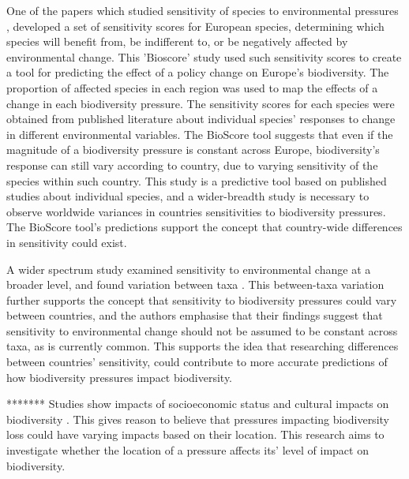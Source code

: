 \documentclass[11pt, a4paper, titlepage]{article}
\begin{document}
	One of the papers which studied sensitivity of species to environmental pressures \cite{louette2010bioscore}, developed a set of sensitivity scores for European species, determining which species will benefit from, be indifferent to, or be negatively affected by environmental change. This 'Bioscore' study used such sensitivity scores to create a tool for predicting the effect of a policy change on Europe's biodiversity. The proportion of  affected species in each region was used to map the effects of a change in each biodiversity pressure. The sensitivity scores for each species were obtained from published literature about individual species' responses to change in different environmental variables. The BioScore tool suggests that even if the magnitude of a biodiversity pressure is constant across Europe, biodiversity's response can still vary according to country, due to varying sensitivity of the species within such country. This study is a predictive tool based on published studies about individual species, and a wider-breadth study is necessary to observe worldwide variances in countries sensitivities to biodiversity pressures. The BioScore tool's predictions support the concept that country-wide differences in sensitivity could exist. \newline
	
	A wider spectrum study examined sensitivity to environmental change at a broader level, and found variation between taxa \cite{sunday2015species}. This between-taxa variation further supports the concept that sensitivity to biodiversity pressures could vary between countries, and the authors emphasise that their findings suggest that sensitivity to environmental change should not be assumed to be constant across taxa, as is currently common. This supports the idea that researching differences between countries' sensitivity, could contribute to more accurate predictions of how biodiversity pressures impact biodiversity. \newline
	
	
	
	
	
	
	
	
	 
   	 
   	 
   	 ******* \newline
   	 Studies show impacts of socioeconomic status and cultural impacts on biodiversity \cite{kinzig2005effects}. This gives reason to believe that pressures impacting biodiversity loss could have varying impacts based on their location. This research aims to investigate whether the location of a pressure affects its' level of impact on biodiversity. 
\end{document}
